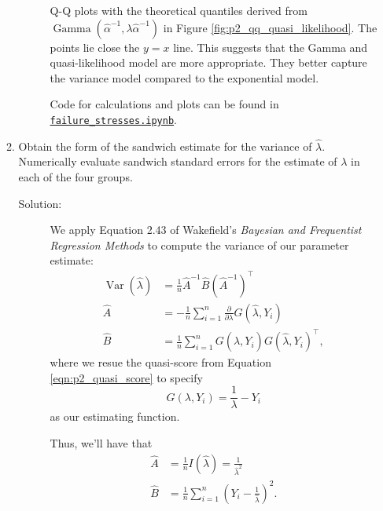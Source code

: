 \documentclass[letterpaper,11pt]{article}
\begin{document}
\begin{enumerate}
\begin{enumerate}
\begin{description}
        Q-Q plots with the theoretical quantiles derived from
        $\operatorname{Gamma}\left(\hat{\alpha}^{-1},
          \lambda\hat{\alpha}^{-1}\right)$ in Figure
        \ref{fig:p2_qq_quasi_likelihood}. The points lie close the $y = x$
        line. This suggests that the Gamma and quasi-likelihood model are more
        appropriate. They better capture the variance model compared to the
        exponential model.

        Code for calculations and plots can be found in
        \href{https://nbviewer.jupyter.org/github/ppham27/stat570/blob/master/hw3/failure\_stresses.ipynb}{\texttt{failure\_stresses.ipynb}}.
      \end{description}
    \item Obtain the form of the sandwich estimate for the variance of
      $\hat{\lambda}$. Numerically evaluate sandwich standard errors for the
      estimate of $\lambda$ in each of the four groups.

      \begin{description}
      \item[Solution:] We apply Equation 2.43 of Wakefield's \emph{Bayesian and
          Frequentist Regression Methods} to compute the variance of our
        parameter estimate:
    \begin{align}
      \operatorname{Var}\left(\hat{\lambda}\right)
      &= \frac{1}{n}\hat{A}^{-1}\hat{B}\left(\hat{A}^{-1}\right)^\intercal \nonumber\\
      \hat{A}
      &= -\frac{1}{n}\sum_{i=1}^n
        \frac{\partial}{\partial\lambda}G\left(\hat{\lambda}, Y_i\right) \nonumber\\
      \hat{B}
      &= \frac{1}{n}\sum_{i=1}^n
        G\left(\hat{\lambda}, Y_i\right)G\left(\hat{\lambda}, Y_i\right)^\intercal, \nonumber
    \end{align}
    where we resue the quasi-score from Equation \ref{eqn:p2_quasi_score} to
    specify
    \begin{equation}
      G\left(\lambda, Y_i\right) = \frac{1}{\lambda} - Y_i
      \label{eqn:p2_sandwich_score}
    \end{equation}
    as our estimating function.

    Thus, we'll have that
    \begin{align}
      \hat{A}
      &= \frac{1}{n}I\left(\hat{\lambda}\right) = \frac{1}{\hat{\lambda}^2} \nonumber\\
      \hat{B}
      &= \frac{1}{n}\sum_{i=1}^n\left(Y_i - \frac{1}{\hat{\lambda}}\right)^2.
    \end{align}


\end{description}
\end{enumerate}
\end{enumerate}
\end{document}
